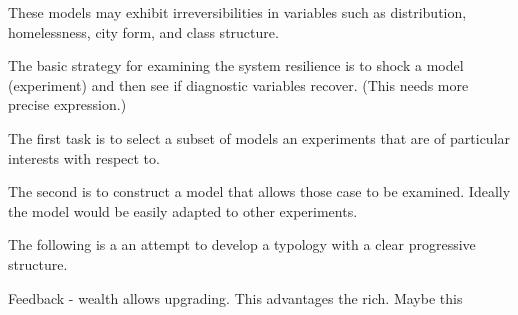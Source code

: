 These models may exhibit irreversibilities in variables such as distribution, homelessness, city form, and class structure. 

The basic strategy for examining the system resilience is to shock a model (experiment) and then see if diagnostic variables recover. (This needs more precise expression.)

The first task is to select a subset of models an experiments that are of particular interests with respect to.

The second is to construct a model that allows those case to be examined. Ideally the model would be easily adapted to other experiments.

The following is a an attempt to develop a typology with a clear progressive structure.

Feedback - wealth allows upgrading. This advantages the rich. Maybe this 

